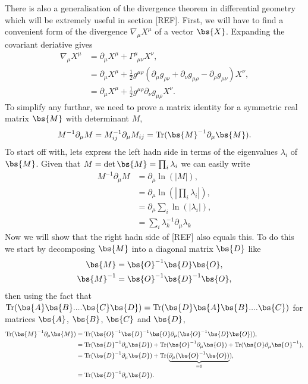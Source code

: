 There is also a generalisation of the divergence theorem in differential geometry which will be extremely useful in section [REF]. First, we will have to find a convenient form of the divergence $\nabla_\mu X^\mu$ of a vector $\bs{X}$. Expanding the covariant deriative gives
\begin{align}
\nabla_\mu X^\mu &= \partial_\mu X^\mu + \Gamma^\mu_{\,\,\,\mu\nu}X^\nu , \\
&= \partial_\mu X^\mu + \frac{1}{2}g^{\mu\rho}\left(\partial_\mu g_{\rho\nu}+\partial_\nu g_{\mu\rho}-\partial_\rho g_{\mu\nu}\right)X^\nu , \\
&= \partial_\mu X^\mu + \frac{1}{2}g^{\mu\rho}\partial_\nu g_{\mu\rho}X^\nu. 
\end{align}
To simplify any furthar, we need to prove a matrix identity for a symmetric real matrix $\bs{M}$ with determinant $M$,
\begin{equation}
M^{-1} \partial_\mu M = M^{-1}_{ij} \partial_\mu M_{ij} = \mathrm{Tr}(\bs{M}^{-1} \partial_\mu \bs{M}).
\end{equation}
To start off with, lets express the left hadn side in terms of the eigenvalues $\lambda_i$ of $\bs{M}$. Given that $M=\det{\bs{M}}=\prod_i \lambda_i$ we can easily write
\begin{align}
M^{-1} \partial_\mu M &= \partial_\mu \ln(|M|) ,\\
&= \partial_\mu \ln\left(\left| \prod_i \lambda_i\right|\right) ,\\
&= \partial_\mu \sum_i \ln(\left|  \lambda_i\right|) ,\\
&= \sum_i \lambda_k^{-1}\partial_\mu \lambda_k 
\end{align}
Now we will show that the right hadn side of [REF] also equals this. To do this we start by decomposing $\bs{M}$ into a diagonal matrix $\bs{D}$ like
\begin{align}
\bs{M} &= \bs{O}^{-1} \bs{D} \bs{O},\\
\bs{M}^{-1} &= \bs{O}^{-1} \bs{D}^{-1} \bs{O},
\end{align}
then using the fact that $\mathrm{Tr}(\bs{A} \bs{B} .... \bs{C}\bs{D}) = \mathrm{Tr}(\bs{D}\bs{A} \bs{B} .... \bs{C})$ for matrices $\bs{A}$, $ \bs{B}$, $ \bs{C}$ and $\bs{D}$,
\begin{align}
\mathrm{Tr}(\bs{M}^{-1} \partial_\mu \bs{M}) &= \mathrm{Tr}(\bs{O}^{-1} \bs{D}^{-1} \bs{O} \partial_\mu (\bs{O}^{-1} \bs{D} \bs{O})) ,\\
&= \mathrm{Tr}(\bs{D}^{-1} \partial_\mu \bs{D}) + \mathrm{Tr}(\bs{O}^{-1} \partial_\mu \bs{O}) +\mathrm{Tr}(\bs{O} \partial_\mu \bs{O}^{-1}) , \\
&= \mathrm{Tr}(\bs{D}^{-1} \partial_\mu \bs{D}) + \mathrm{Tr}( \underbrace{\partial_\mu (\bs{O}^{-1}\bs{O})}_{=0}) , \\
&= \mathrm{Tr}(\bs{D}^{-1} \partial_\mu \bs{D}) .
\end{align}
